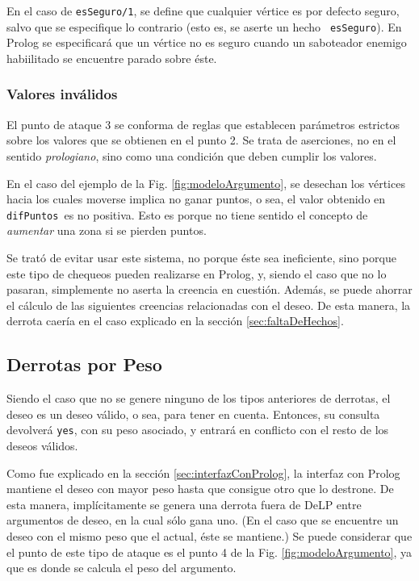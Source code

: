 \documentclass[oneside]{book}
\begin{document}
En el caso de \texttt{esSeguro/1}, se define que cualquier vértice es por defecto
seguro, salvo que se especifique lo contrario (esto es, se aserte un hecho
\texttt{~esSeguro}). En Prolog se especificará que un vértice no es seguro cuando
un saboteador enemigo habiilitado se encuentre parado sobre éste.

\subsubsection{Valores inválidos}

El punto de ataque 3 se conforma de reglas que establecen parámetros estrictos
sobre los valores que se obtienen en el punto 2. Se trata de aserciones, no en el 
sentido \textit{prologiano}, sino como una condición que deben cumplir los valores. 

En el caso del ejemplo de la Fig.
\ref{fig:modeloArgumento}, se desechan los vértices hacia los cuales moverse 
implica no ganar puntos, o sea, el valor obtenido en \texttt{difPuntos}\ es no
positiva. Esto es porque no tiene sentido el concepto de \emph{aumentar} una zona
si se pierden puntos.

Se trató de evitar usar este sistema, no porque éste sea ineficiente, sino 
porque este tipo de chequeos pueden realizarse en Prolog, y, siendo el caso que
no lo pasaran, simplemente no aserta la creencia en cuestión. Además, se puede
ahorrar el cálculo de las siguientes creencias relacionadas con el deseo. De esta
manera, la derrota caería en el caso explicado en la sección 
\ref{sec:faltaDeHechos}.

\subsection{Derrotas por Peso}

Siendo el caso que no se genere ninguno de los tipos anteriores de derrotas, el
deseo es un deseo válido, o sea, para tener en cuenta. Entonces, su consulta 
devolverá \texttt{yes}, con su peso asociado, y entrará en conflicto con el resto
de los deseos válidos.

Como fue explicado en la sección \ref{sec:interfazConProlog}, la interfaz con 
Prolog mantiene el deseo con mayor peso hasta que consigue otro que lo destrone.
De esta manera, implícitamente se genera una derrota fuera de DeLP entre 
argumentos de deseo, en la cual sólo gana uno. (En el caso que se encuentre un 
deseo con el mismo peso que el actual, éste se mantiene.) Se puede considerar
que el punto de este tipo de ataque es el punto 4 de la Fig. 
\ref{fig:modeloArgumento}, ya que es donde se calcula el peso del argumento.
\end{document}

